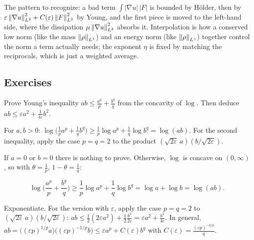 The pattern to recognize: a bad term $\int |\nabla u|\,|F|$ is bounded by Hölder, then by $\varepsilon\left\lVert \nabla u\right\rVert_{L^2}^2 + C(\varepsilon)\left\lVert F\right\rVert_{L^2}^2$ by Young, and the first piece is moved to the left-hand side, where the dissipation $\mu\left\lVert \nabla u\right\rVert_{L^2}^2$ absorbs it. Interpolation is how a conserved low norm (like the mass $\left\lVert \rho\right\rVert_{L^1}$) and an energy norm (like $\left\lVert \rho\right\rVert_{L^\gamma}$) together control the norm a term actually needs; the exponent $\eta$ is fixed by matching the reciprocals, which is just a weighted average.

\subsection*{Exercises}

\begin{exercise}
  Prove Young's inequality $ab \le \frac{a^p}{p} + \frac{b^q}{q}$ from the concavity of $\log$. Then deduce $ab \le \varepsilon a^2 + \frac{1}{4\varepsilon}b^2$.
  \begin{hint}
    For $a, b > 0$: $\log\big(\frac1p a^p + \frac1q b^q\big) \ge \frac1p\log a^p + \frac1q\log b^q = \log(ab)$. For the second inequality, apply the case $p = q = 2$ to the product $(\sqrt{2\varepsilon}\,a)(b/\sqrt{2\varepsilon})$.
  \end{hint}
  \begin{solution}
    If $a = 0$ or $b = 0$ there is nothing to prove. Otherwise, $\log$ is concave on $(0,\infty)$, so with $\theta = \frac1p$, $1 - \theta = \frac1q$:

    \[ \log\Big(\frac{a^p}{p} + \frac{b^q}{q}\Big) \ge \frac1p\log a^p + \frac1q\log b^q = \log a + \log b = \log(ab). \]

    Exponentiate. For the version with $\varepsilon$, apply the case $p = q = 2$ to $(\sqrt{2\varepsilon}\,a)(b/\sqrt{2\varepsilon})$: $ab \le \frac12(2\varepsilon a^2) + \frac12\frac{b^2}{2\varepsilon} = \varepsilon a^2 + \frac{b^2}{4\varepsilon}$. In general, $ab = \big((\varepsilon p)^{1/p}a\big)\big((\varepsilon p)^{-1/p}b\big) \le \varepsilon a^p + C(\varepsilon)b^q$ with $C(\varepsilon) = \frac{(\varepsilon p)^{-q/p}}{q}$.
  \end{solution}
\end{exercise}

